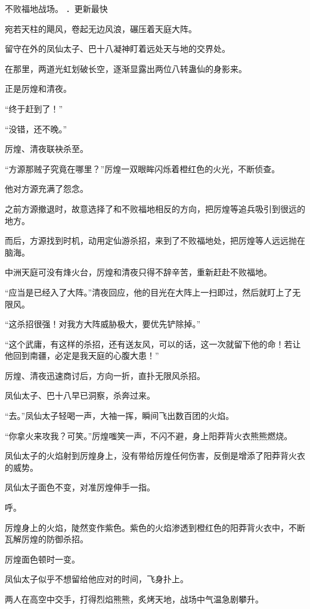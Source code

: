 
\begin{this_body}

不败福地战场。 ．更新最快

宛若天柱的飓风，卷起无边风浪，碾压着天庭大阵。

留守在外的凤仙太子、巴十八凝神盯着远处天与地的交界处。

在那里，两道光虹划破长空，逐渐显露出两位八转蛊仙的身影来。

正是厉煌和清夜。

“终于赶到了！”

“没错，还不晚。”

厉煌、清夜联袂杀至。

“方源那贼子究竟在哪里？”厉煌一双眼眸闪烁着橙红色的火光，不断侦查。

他对方源充满了怨念。

之前方源撤退时，故意选择了和不败福地相反的方向，把厉煌等追兵吸引到很远的地方。

而后，方源找到时机，动用定仙游杀招，来到了不败福地处，把厉煌等人远远抛在脑海。

中洲天庭可没有烽火台，厉煌和清夜只得不辞辛苦，重新赶赴不败福地。

“应当是已经入了大阵。”清夜回应，他的目光在大阵上一扫即过，然后就盯上了无限风。

“这杀招很强！对我方大阵威胁极大，要优先铲除掉。”

“这个武庸，有这样的杀招，还有送友风，可以的话，这一次就留下他的命！若让他回到南疆，必定是我天庭的心腹大患！”

厉煌、清夜迅速商讨后，方向一折，直扑无限风杀招。

凤仙太子、巴十八早已洞察，杀奔过来。

“去。”凤仙太子轻喝一声，大袖一挥，瞬间飞出数百团的火焰。

“你拿火来攻我？可笑。”厉煌嗤笑一声，不闪不避，身上阳莽背火衣熊熊燃烧。

凤仙太子的火焰射到厉煌身上，没有带给厉煌任何伤害，反倒是增添了阳莽背火衣的威势。

凤仙太子面色不变，对准厉煌伸手一指。

呼。

厉煌身上的火焰，陡然变作紫色。紫色的火焰渗透到橙红色的阳莽背火衣中，不断瓦解厉煌的防御杀招。

厉煌面色顿时一变。

凤仙太子似乎不想留给他应对的时间，飞身扑上。

两人在高空中交手，打得烈焰熊熊，炙烤天地，战场中气温急剧攀升。


\end{this_body}
